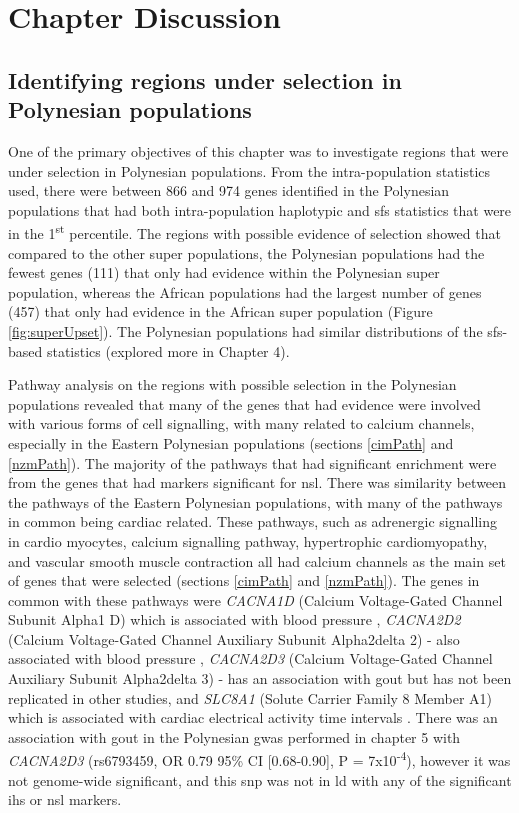 \documentclass[]{report}
\begin{document}
\section{Chapter Discussion}\label{selectionDissussion}

\subsection{Identifying regions under selection in Polynesian
populations}\label{identifying-regions-under-selection-in-polynesian-populations}

One of the primary objectives of this chapter was to investigate regions
that were under selection in Polynesian populations. From the
intra-population statistics used, there were between 866 and 974 genes
identified in the Polynesian populations that had both intra-population
haplotypic and \gls{sfs} statistics that were in the
1\textsuperscript{st} percentile. The regions with possible evidence of
selection showed that compared to the other super populations, the
Polynesian populations had the fewest genes (111) that only had evidence
within the Polynesian super population, whereas the African populations
had the largest number of genes (457) that only had evidence in the
African super population (Figure \ref{fig:superUpset}). The Polynesian
populations had similar distributions of the \gls{sfs}-based statistics
(explored more in Chapter 4).

Pathway analysis on the regions with possible selection in the
Polynesian populations revealed that many of the genes that had evidence
were involved with various forms of cell signalling, with many related
to calcium channels, especially in the Eastern Polynesian populations
(sections \ref{cimPath} and \ref{nzmPath}). The majority of the pathways
that had significant enrichment were from the genes that had markers
significant for \gls{nsl}. There was similarity between the pathways of
the Eastern Polynesian populations, with many of the pathways in common
being cardiac related. These pathways, such as adrenergic signalling in
cardio myocytes, calcium signalling pathway, hypertrophic
cardiomyopathy, and vascular smooth muscle contraction all had calcium
channels as the main set of genes that were selected (sections
\ref{cimPath} and \ref{nzmPath}). The genes in common with these
pathways were \emph{CACNA1D} (Calcium Voltage-Gated Channel Subunit
Alpha1 D) which is associated with blood pressure \citep{Lu2015},
\emph{CACNA2D2} (Calcium Voltage-Gated Channel Auxiliary Subunit
Alpha2delta 2) - also associated with blood pressure \citep{Warren2017},
\emph{CACNA2D3} (Calcium Voltage-Gated Channel Auxiliary Subunit
Alpha2delta 3) - has an association with gout \citep{Lai2012} but has
not been replicated in other studies, and \emph{SLC8A1} (Solute Carrier
Family 8 Member A1) which is associated with cardiac electrical activity
time intervals \citep{Arking2014}. There was an association with gout in
the Polynesian \gls{gwas} performed in chapter 5 with \emph{CACNA2D3}
(rs6793459, OR 0.79 95\% CI {[}0.68-0.90{]}, P =
7x10\textsuperscript{-4}), however it was not genome-wide significant,
and this \gls{snp} was not in \gls{ld} with any of the significant
\gls{ihs} or \gls{nsl} markers.
\end{document}
